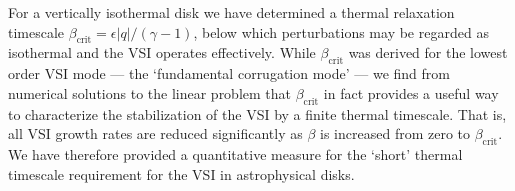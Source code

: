 
For a vertically isothermal disk we have determined a thermal
relaxation timescale $\beta_\mathrm{crit}=\epsilon|q|/(\gamma-1)$,
below which perturbations may be regarded as isothermal and the VSI 
operates effectively. While $\beta_\mathrm{crit}$ was derived for the
lowest order VSI mode --- the `fundamental 
corrugation mode' --- we find from numerical solutions to the  linear
problem that $\beta_\mathrm{crit}$ in fact provides a useful way to
characterize the stabilization of the VSI by a finite thermal 
timescale. That is, all VSI growth rates are reduced significantly as
$\beta$ is increased from zero to $\beta_\mathrm{crit}$.  
We have therefore provided a quantitative measure for the 
`short' thermal timescale requirement for the VSI in astrophysical
disks.   





